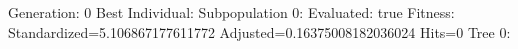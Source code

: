 \documentclass[]{article}
\begin{document}
Generation: 0
Best Individual:
Subpopulation 0:
Evaluated: true
Fitness: Standardized=5.106867177611772 Adjusted=0.16375008182036024 Hits=0
Tree 0:
\begin{bundle}{\gpbox{+}}\end{bundle}
\end{document}
